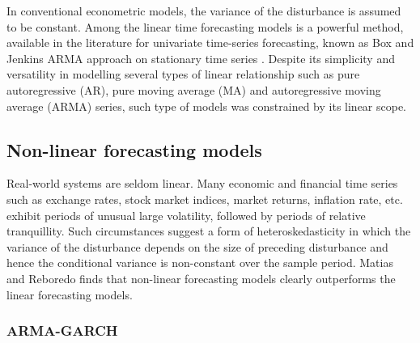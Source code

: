 In conventional econometric models, the variance of the disturbance is assumed to be constant. Among the linear time forecasting models is a powerful method, available in the literature for univariate time-series forecasting, known as Box and Jenkins ARMA approach on stationary time series \cite{B&J}. Despite its simplicity and versatility in modelling several types of linear relationship such as pure autoregressive (AR), pure moving average (MA) and autoregressive moving average (ARMA) series, such type of models was constrained by its linear scope. 

\subsection{Non-linear forecasting models}

Real-world systems are seldom linear. Many economic and financial time series such as exchange rates, stock market indices, market returns, inflation rate, etc. exhibit periods of unusual large volatility, followed by periods of relative tranquillity. Such circumstances suggest a form of heteroskedasticity in which the variance of the disturbance depends on the size of preceding disturbance and hence the conditional variance is non-constant over the sample period. Matias and Reboredo \cite{M&R} finds that non-linear forecasting models clearly outperforms the linear forecasting models.

\subsubsection{ARMA-GARCH}

